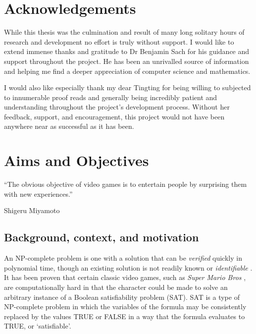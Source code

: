 \documentclass[11pt, a4paper, oneside]{report} %
\begin{document}
\chapter*{Acknowledgements}

While this thesis was the culmination and result of many long solitary hours of
research and development no effort is truly without support. I would like to
extend immense thanks and gratitude to Dr Benjamin Sach for his guidance and
support throughout the project. He has been an unrivalled source of information
and helping me find a deeper appreciation of computer science and mathematics.

I would also like especially thank my dear Tingting for being willing to
subjected to innumerable proof reads and generally being incredibly patient and
understanding throughout the project's development process. Without her
feedback, support, and encouragement, this project would not have been anywhere
near as successful as it has been.



\tableofcontents



\chapter{Aims and Objectives}

\epigraph{``The obvious objective of video games is to entertain people by
surprising them with new experiences.''}{Shigeru Miyamoto}

\section{Background, context, and motivation}

An NP-complete problem is one with a solution that can be \textit{verified}
quickly in polynomial time, though an existing solution is not readily known or
\textit{identifiable} \cite{cook1984can}. It has been proven that certain
classic video games, such as \textit{Super Mario Bros} \cite{Aloupis2012}, are
computationally hard in that the character could be made to solve an arbitrary
instance of a Boolean satisfiability problem (SAT). SAT is a type of NP-complete
problem in which the variables of the formula may be consistently replaced by
the values TRUE or FALSE in a way that the formula evaluates to TRUE, or
`satisfiable'.
\end{document}
